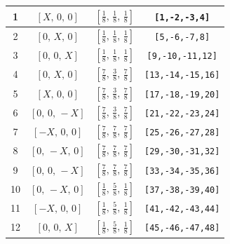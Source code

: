 \documentclass[fleqn,8pt]{jsarticle}
\begin{document}
\begin{longtable}{cccc}
1 & $\left[ X,\, 0,\, 0 \right]$ & $\left[ \frac{1}{8},\, \frac{1}{8},\, \frac{1}{8} \right]$ & {\tt [1,-2,-3,4]} \\ \hline
2 & $\left[ 0,\, X,\, 0 \right]$ & $\left[ \frac{1}{8},\, \frac{1}{8},\, \frac{1}{8} \right]$ & {\tt [5,-6,-7,8]} \\ \hline
3 & $\left[ 0,\, 0,\, X \right]$ & $\left[ \frac{1}{8},\, \frac{1}{8},\, \frac{1}{8} \right]$ & {\tt [9,-10,-11,12]} \\ \hline
4 & $\left[ 0,\, X,\, 0 \right]$ & $\left[ \frac{7}{8},\, \frac{3}{8},\, \frac{7}{8} \right]$ & {\tt [13,-14,-15,16]} \\ \hline
5 & $\left[ X,\, 0,\, 0 \right]$ & $\left[ \frac{7}{8},\, \frac{3}{8},\, \frac{7}{8} \right]$ & {\tt [17,-18,-19,20]} \\ \hline
6 & $\left[ 0,\, 0,\, - X \right]$ & $\left[ \frac{7}{8},\, \frac{3}{8},\, \frac{7}{8} \right]$ & {\tt [21,-22,-23,24]} \\ \hline
7 & $\left[ - X,\, 0,\, 0 \right]$ & $\left[ \frac{7}{8},\, \frac{7}{8},\, \frac{7}{8} \right]$ & {\tt [25,-26,-27,28]} \\ \hline
8 & $\left[ 0,\, - X,\, 0 \right]$ & $\left[ \frac{7}{8},\, \frac{7}{8},\, \frac{7}{8} \right]$ & {\tt [29,-30,-31,32]} \\ \hline
9 & $\left[ 0,\, 0,\, - X \right]$ & $\left[ \frac{7}{8},\, \frac{7}{8},\, \frac{7}{8} \right]$ & {\tt [33,-34,-35,36]} \\ \hline
10 & $\left[ 0,\, - X,\, 0 \right]$ & $\left[ \frac{1}{8},\, \frac{5}{8},\, \frac{1}{8} \right]$ & {\tt [37,-38,-39,40]} \\ \hline
11 & $\left[ - X,\, 0,\, 0 \right]$ & $\left[ \frac{1}{8},\, \frac{5}{8},\, \frac{1}{8} \right]$ & {\tt [41,-42,-43,44]} \\ \hline
12 & $\left[ 0,\, 0,\, X \right]$ & $\left[ \frac{1}{8},\, \frac{5}{8},\, \frac{1}{8} \right]$ & {\tt [45,-46,-47,48]} \\
\end{longtable}
\renewcommand{\arraystretch}{1.2}
\end{document}
